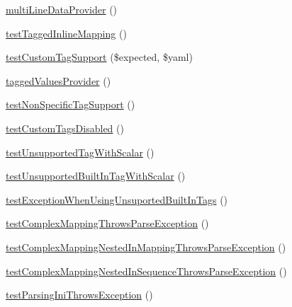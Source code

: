 \begin{DoxyCompactItemize}
\mbox{\hyperlink{class_symfony_1_1_component_1_1_yaml_1_1_tests_1_1_parser_test_a2853bee086ac2728a41592741fcfde10}{multi\+Line\+Data\+Provider}} ()
\item 
\mbox{\hyperlink{class_symfony_1_1_component_1_1_yaml_1_1_tests_1_1_parser_test_a4efdb987e8dfd3b13c94a3b89b372667}{test\+Tagged\+Inline\+Mapping}} ()
\item 
\mbox{\hyperlink{class_symfony_1_1_component_1_1_yaml_1_1_tests_1_1_parser_test_ab2ddae9871e0f9668d3cc01db1d8057f}{test\+Custom\+Tag\+Support}} (\$expected, \$yaml)
\item 
\mbox{\hyperlink{class_symfony_1_1_component_1_1_yaml_1_1_tests_1_1_parser_test_ac7dc1941032477376fa52ed393bafa53}{tagged\+Values\+Provider}} ()
\item 
\mbox{\hyperlink{class_symfony_1_1_component_1_1_yaml_1_1_tests_1_1_parser_test_acfadd54e19aab7e8b7b70729711a1dd0}{test\+Non\+Specific\+Tag\+Support}} ()
\item 
\mbox{\hyperlink{class_symfony_1_1_component_1_1_yaml_1_1_tests_1_1_parser_test_a8a4bc22c90e5ca8ef6b59c29d8c334bb}{test\+Custom\+Tags\+Disabled}} ()
\item 
\mbox{\hyperlink{class_symfony_1_1_component_1_1_yaml_1_1_tests_1_1_parser_test_a0c1bcc31dd6fdecc3cc833f5a9f8d568}{test\+Unsupported\+Tag\+With\+Scalar}} ()
\item 
\mbox{\hyperlink{class_symfony_1_1_component_1_1_yaml_1_1_tests_1_1_parser_test_abe091b9fef8f937b40a26ef3195bd2cd}{test\+Unsupported\+Built\+In\+Tag\+With\+Scalar}} ()
\item 
\mbox{\hyperlink{class_symfony_1_1_component_1_1_yaml_1_1_tests_1_1_parser_test_af52497f5e1c4ce90dd6549793210e2a4}{test\+Exception\+When\+Using\+Unsuported\+Built\+In\+Tags}} ()
\item 
\mbox{\hyperlink{class_symfony_1_1_component_1_1_yaml_1_1_tests_1_1_parser_test_ab4b1e0b36495e9c932b1a39bafd0ef7f}{test\+Complex\+Mapping\+Throws\+Parse\+Exception}} ()
\item 
\mbox{\hyperlink{class_symfony_1_1_component_1_1_yaml_1_1_tests_1_1_parser_test_a3ddcb1a54b4580cf2a2098939f06ad4c}{test\+Complex\+Mapping\+Nested\+In\+Mapping\+Throws\+Parse\+Exception}} ()
\item 
\mbox{\hyperlink{class_symfony_1_1_component_1_1_yaml_1_1_tests_1_1_parser_test_a6c2b35fb52ad45d948fe9b3e2949b2f5}{test\+Complex\+Mapping\+Nested\+In\+Sequence\+Throws\+Parse\+Exception}} ()
\item 
\mbox{\hyperlink{class_symfony_1_1_component_1_1_yaml_1_1_tests_1_1_parser_test_a389cbf5da273a9e2e945d3e9358c4160}{test\+Parsing\+Ini\+Throws\+Exception}} ()

\end{DoxyCompactItemize}
